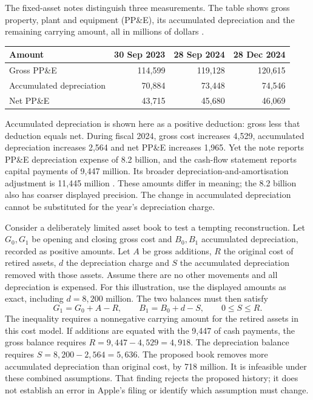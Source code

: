 The fixed-asset notes distinguish three measurements. The table shows gross
property, plant and equipment (PP\&E), its accumulated depreciation and the
remaining carrying amount, all in millions of dollars
\citep[Note 5, printed p.~39]{apple2024}
\citep[Note 5, printed p.~9]{apple2025q1}.

\begin{center}
\begin{tabularx}{\linewidth}{@{}Xrrr@{}}
\toprule
Amount & 30 Sep 2023 & 28 Sep 2024 & 28 Dec 2024\\\midrule
Gross PP\&E & 114,599 & 119,128 & 120,615\\
Accumulated depreciation & 70,884 & 73,448 & 74,546\\
Net PP\&E & 43,715 & 45,680 & 46,069\\\bottomrule
\end{tabularx}
\end{center}

Accumulated depreciation is shown here as a positive deduction: gross less
that deduction equals net. During fiscal 2024, gross cost increases 4,529,
accumulated depreciation increases 2,564 and net PP\&E increases 1,965.
Yet the note reports PP\&E depreciation expense of 8.2 billion, and the
cash-flow statement reports capital payments of 9,447 million. Its broader
depreciation-and-amortisation adjustment is 11,445 million
\citep[printed pp.~33 and 39]{apple2024}. These amounts differ in meaning;
the 8.2 billion also has coarser displayed precision. The change in accumulated
depreciation cannot be substituted for the year's depreciation charge.

Consider a deliberately limited asset book to test a tempting reconstruction.
Let $G_0,G_1$ be opening and closing gross cost and $B_0,B_1$ accumulated
depreciation, recorded as positive amounts. Let $A$ be gross additions, $R$
the original cost of retired assets, $d$ the depreciation charge and $S$ the
accumulated depreciation removed with those assets. Assume there are no other
movements and all depreciation is expensed. For this illustration, use the
displayed amounts as exact, including $d=8{,}200$ million. The two balances
must then satisfy
\begin{equation}
 G_1=G_0+A-R,\qquad B_1=B_0+d-S,\qquad 0\leq S\leq R.
 \label{eq:apple-asset-movement}
\end{equation}
The inequality requires a nonnegative carrying amount for the retired assets
in this cost model. If additions are equated with the 9,447 of cash payments,
the gross balance requires $R=9{,}447-4{,}529=4{,}918$. The depreciation
balance requires $S=8{,}200-2{,}564=5{,}636$. The proposed book removes more
accumulated depreciation than original cost, by 718 million. It is infeasible
under these combined assumptions. That finding rejects the proposed history;
it does not establish an error in Apple's filing or identify which assumption
must change.

